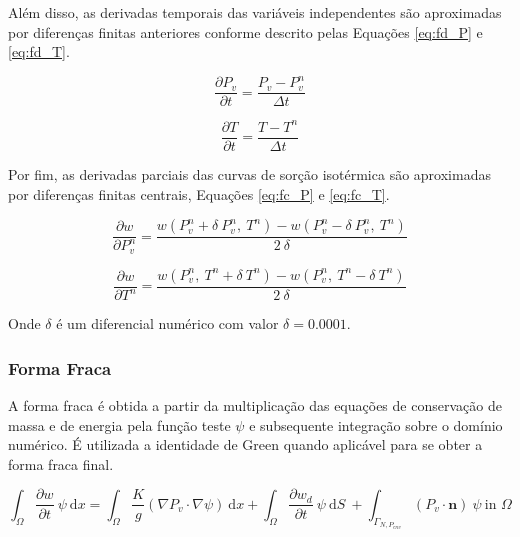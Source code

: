     Além disso, as derivadas temporais das variáveis independentes são aproximadas
    por diferenças finitas anteriores conforme descrito pelas Equações \ref{eq:fd_P} e \ref{eq:fd_T}.

    \begin{equation}
      \label{eq:fd_P}
      \frac{\partial P_v}{\partial t} = \frac{P_v - P_v^n}{\Delta t}
    \end{equation}
    
    \begin{equation}
      \label{eq:fd_T}
      \frac{\partial T}{\partial t} = \frac{T - T^n}{\Delta t}
    \end{equation}

    Por fim, as derivadas parciais das curvas de sorção isotérmica são
    aproximadas por diferenças finitas centrais, Equações \ref{eq:fc_P} e \ref{eq:fc_T}.

    \begin{equation}
      \label{eq:fc_P}
      \frac{\partial w}{\partial P_v^n} = \frac{w(P_v^n+\delta \ P_v^n, \ T^n)- w(P_v^n- \delta \ P_v^n , \ T^n)}{2 \ \delta}
    \end{equation}

    
    \begin{equation}
      \label{eq:fc_T}
      \frac{\partial w}{\partial T^n} = \frac{w(P_v^n, \ T^n+\delta \ T^n)- w(P_v^n, \ T^n- \delta \ T^n)}{2 \ \delta}
    \end{equation}

    Onde $\delta$ é um diferencial numérico com valor $\delta = 0.0001$.

    
    \subsubsection{Forma Fraca}\label{mat:fraca}
    A forma fraca é obtida a partir da multiplicação das equações de conservação
    de massa e de energia pela função teste $\psi$ e subsequente integração
    sobre o domínio numérico. É utilizada a identidade de Green quando aplicável
    para se obter a forma fraca final.

  \begin{equation}
     \label{eq:weak_MB}
  \int_{\Omega}  \frac{\partial w}{\partial t} \ \psi \ \text{d}x =   \int_{\Omega}    \frac{K}{g} \left(  \nabla P_v \cdot \nabla  \psi \right) \ \text{d}x +   \int_{\Omega}    \frac{\partial w_d}{\partial t}  \ \psi \ \text{d}S \ +   \int_{\Gamma_{N, P_{env}}} \left( P_v \cdot \mathbf{n} \right) \ \psi \ \text{in } \Omega
   \end{equation}

